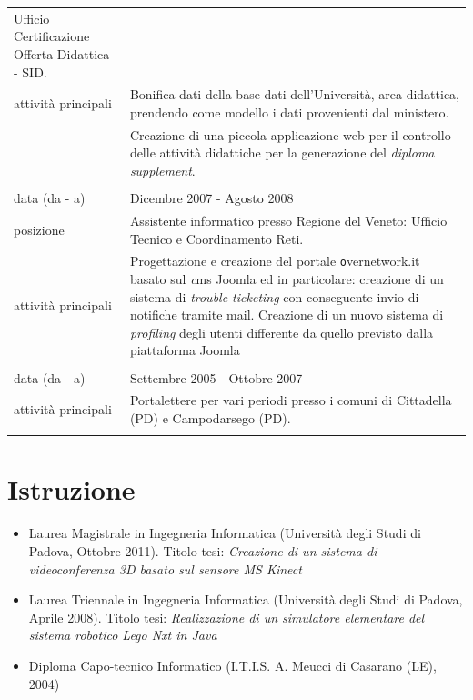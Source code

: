 \documentclass[pdftex,a4paper,10pt,twoside,titlepage,italian]{article}
\begin{document}
\begin{tabular}[h]{l p{}}
					Ufficio Certificazione Offerta Didattica - SID.\\
\footnotesize{attività principali} & Bonifica dati della base dati dell'Università, area didattica, prendendo come 
		modello i dati provenienti dal ministero.\\
		& Creazione di una piccola applicazione web per il controllo delle attività didattiche
		per la generazione del \textit{diploma supplement}.\\
& \\
\footnotesize{data (da - a)} & Dicembre 2007 - Agosto 2008 \\
\footnotesize{posizione} & Assistente informatico presso Regione del Veneto: Ufficio Tecnico e Coordinamento Reti.\\
\footnotesize{attività principali} & Progettazione e creazione del portale {\texttt overnetwork.it} basato sul {\textit cms Joomla}
		ed in particolare: creazione di un sistema di \textit{trouble ticketing} con conseguente 
		invio di notifiche tramite mail. Creazione di un nuovo sistema di \textit{profiling}
		degli utenti differente da quello previsto dalla piattaforma Joomla\\
& \\
\footnotesize{data (da - a)} & Settembre 2005 - Ottobre 2007 \\
\footnotesize{attività principali} & Portalettere per vari periodi presso i comuni di Cittadella (PD) e Campodarsego (PD).\\
& \\
\end{tabular}

\section*{Istruzione}
\begin{itemize}
	\item Laurea Magistrale in Ingegneria Informatica (Università degli Studi di Padova, Ottobre 2011).
	Titolo tesi: {\itshape Creazione di un sistema di videoconferenza 3D basato sul sensore MS Kinect}
	\item Laurea Triennale in Ingegneria Informatica (Università degli Studi di Padova, Aprile 2008). 
	Titolo tesi: {\itshape Realizzazione di un simulatore elementare del sistema robotico Lego Nxt
	in Java}
	\item Diploma Capo-tecnico Informatico (I.T.I.S. A. Meucci di Casarano (LE), 2004)
\end{itemize}
\end{document}

